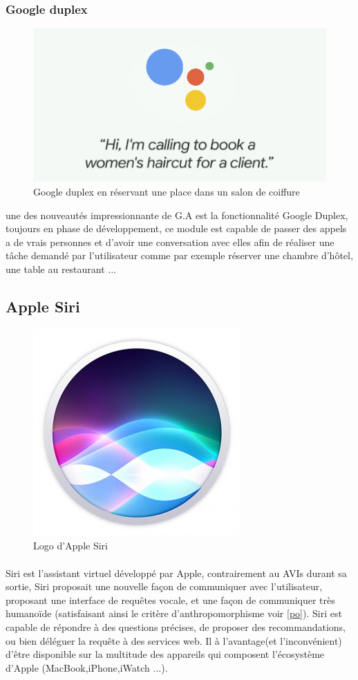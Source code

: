 \subsubsection*{Google duplex}
\begin{figure}[H]
	\centering
	\includegraphics[width=.5\linewidth]{images/google_assitant/duplex.png} 
	\caption{Google duplex en réservant une place dans un salon de coiffure} 
\end{figure}
\par une des nouveautés impressionnante de G.A est la fonctionnalité Google Duplex, toujours en phase de développement, ce module est capable de passer des appels a de vrais personnes et d'avoir une conversation avec elles afin de réaliser une tâche demandé par l'utilisateur comme par exemple réserver une chambre d'hôtel, une table au restaurant ... 



\subsection*{Apple Siri}
\begin{figure}[H]
	\centering
	\includegraphics[width=.25\linewidth]{images/apple_siri/logo.png}
	\caption{Logo d'Apple Siri} 
\end{figure}
\paragraph{}
Siri est l'assistant virtuel développé par Apple, contrairement au AVIs durant sa sortie, Siri proposait une nouvelle façon de communiquer avec l'utilisateur, proposant une interface de requêtes vocale, et une façon de communiquer très humanoïde (satisfaisant ainsi le critère d'anthropomorphisme voir \ref{po}).
Siri est capable de répondre à des questions précises, de proposer des recommandations, ou bien déléguer la requête à des services web. Il à l'avantage(et l'inconvénient) d'être disponible sur la multitude des appareils qui composent l'écosystème d'Apple (MacBook,iPhone,iWatch ...).

